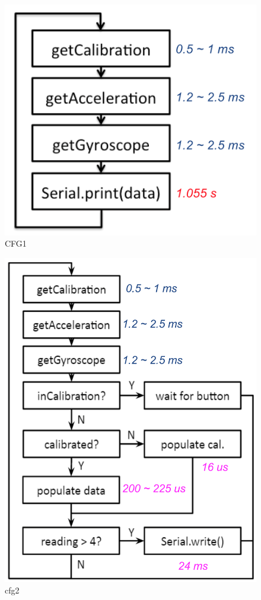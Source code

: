 \documentclass[12pt,journal]{IEEEtran}
\begin{document}
\begin{figure}[h]
    \includegraphics[width=0.8\linewidth]{figures/cfg1}
  \caption{CFG1}
  \label{fig:cfg1}
\end{figure}
\begin{figure}[H]
    \includegraphics[width=0.8\linewidth]{figures/cfg2}
  \caption{cfg2}
  \label{fig:cfg2}
\end{figure}
\end{document}
